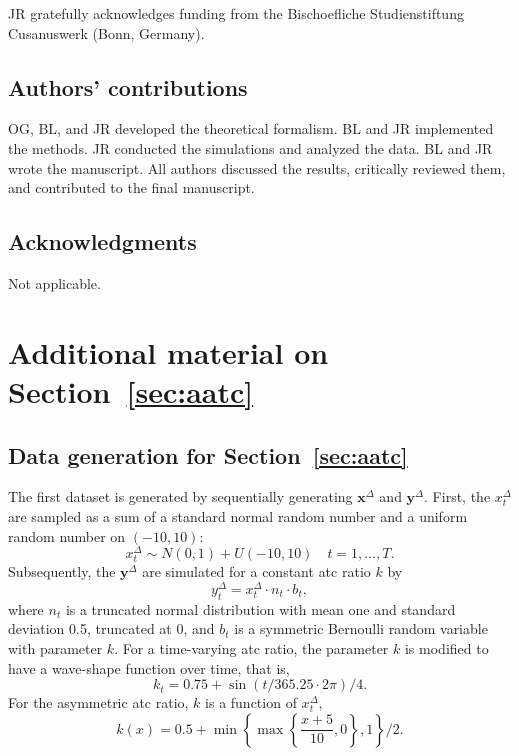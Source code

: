 \documentclass[pdflatex]{sn-jnl}
\theoremstyle{plain}%
\theoremstyle{definition}
\newcommand{\diffx}{\mathbf{x}^{\Delta}}
\newcommand{\diffy}{\mathbf{y}^{\Delta}}
\newcommand{\diffxt}[1][t]{x^{\Delta}_{#1}}
\newcommand{\diffyt}[1][t]{y^{\Delta}_{#1}}
\begin{document}
JR gratefully acknowledges funding from the Bischoefliche Studienstiftung Cusanuswerk (Bonn, Germany).

\subsection*{Authors' contributions}

OG, BL, and JR developed the theoretical formalism.
BL and JR implemented the methods.
JR conducted the simulations and analyzed the data.
BL and JR wrote the manuscript.
All authors discussed the results, critically reviewed them, and contributed to the final manuscript.

\subsection*{Acknowledgments}

Not applicable.

\printbibliography
%

\appendix

\section{Additional material on Section~\ref{sec:aatc}}\label{sec:appendix-atc}

\subsection{Data generation for Section~\ref{sec:aatc}}\label{subsec:app-ATC-data-generation}

The first dataset is generated by sequentially generating $\diffx$ and $\diffy$.
First, the $\diffxt$ are sampled as a sum of a standard normal random number and a uniform random number on $(-10, 10)$:
\begin{equation*}
    \diffxt \sim N(0, 1) + U(-10, 10) \quad t = 1, \dots, T.
\end{equation*}
Subsequently, the $\diffy$ are simulated for a constant \ac{atc} ratio $k$ by
\begin{equation*}
    \diffyt = \diffxt \cdot n_t \cdot b_t,
\end{equation*}
where $n_t$ is a truncated normal distribution with mean one and standard deviation 0.5, truncated at 0, and $b_t$ is a symmetric Bernoulli random variable with parameter $k$.
For a time-varying \ac{atc} ratio, the parameter $k$ is modified to have a wave-shape function over time, that is,
\begin{equation*}
    k_t = 0.75 + \sin(t / 365.25 \cdot 2 \pi) / 4.
\end{equation*}
For the asymmetric \ac{atc} ratio, $k$ is a function of $\diffxt$,
\begin{equation*}
    k(x) = 0.5 + \min \left\{ \max \left\{ \frac{x + 5}{10}, 0  \right\} , 1 \right\} / 2.
\end{equation*}
\end{document}

